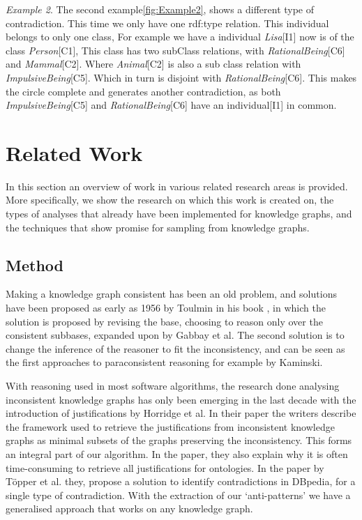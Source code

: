 \documentclass[11pt,letterpaper ,oneside ]{book}
\begin{document}
\textit{Example 2}. The second example\ref{fig:Example2}, shows a different type of contradiction. This time we only have one rdf:type relation. This individual belongs to only one class, For example we have a individual \textit{Lisa}[I1] now is of the class \textit{Person}[C1], This class has two subClass relations, with \textit{RationalBeing}[C6] and \textit{Mammal}[C2]. Where \textit{Animal}[C2] is also a sub class relation with \textit{ImpulsiveBeing}[C5]. Which in turn is disjoint with \textit{RationalBeing}[C6]. This makes the circle complete and generates another contradiction, as both \textit{ImpulsiveBeing}[C5] and \textit{RationalBeing}[C6] have an individual[I1] in common. \\


\chapter{Related Work}\label{RelatedWork}
In this section an overview of work in various related research areas is provided. More specifically, we show the research on which this work is created on, the types of analyses that already have been implemented for knowledge graphs, and the techniques that show promise for sampling from knowledge graphs. \\

\section{Method}
Making a knowledge graph consistent has been an old problem, and solutions have been proposed as early as 1956 by Toulmin in his book \cite{toulmin:1956}, in which the solution is proposed by revising the base, choosing to reason only over the consistent subbases, expanded upon by Gabbay et al\cite{Gabbay:1994}. The second solution is to change the inference of the reasoner to fit the inconsistency, and can be seen as the first approaches to paraconsistent reasoning for example by Kaminski\cite{Kaminski:2015}.

With reasoning used in most software algorithms, the research done analysing inconsistent knowledge graphs has only been emerging in the last decade with the introduction of justifications by Horridge et al\cite{Horridge:2009}. In their paper the writers describe the framework used to retrieve the justifications from inconsistent knowledge graphs as minimal subsets of the graphs preserving the inconsistency. This forms an integral part of our algorithm. In the paper, they also explain why it is often time-consuming to retrieve all justifications for ontologies. In the paper by T\"{o}pper et al. \cite{Topper:2012} they, propose a solution to identify contradictions in DBpedia, for a single type of contradiction. With the extraction of our `anti-patterns' we have a generalised approach that works on any knowledge graph. \\
\end{document}
